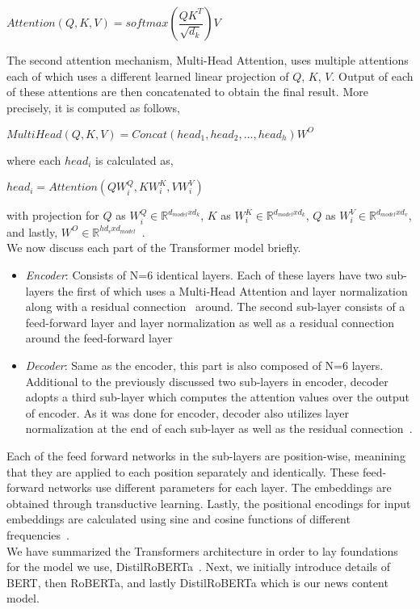 \begin{center}
    $Attention(Q, K, V) = softmax(\dfrac{QK^T}{\sqrt{d_k}})V$
\end{center}
The second attention mechanism, Multi-Head Attention, uses multiple attentions each of which uses a different learned linear projection of $Q$, $K$, $V$. Output of each of these attentions are then concatenated to obtain the final result. More precisely, it is computed as follows,
\begin{center}
    $MultiHead(Q, K, V) = Concat(head_1, head_2, \dots, head_h)W^{O}$
\end{center}
where each $head_i$ is calculated as,
\begin{center}
    $head_i = Attention(QW_i^Q, KW_i^K, VW_i^V)$
\end{center}
with projection for $Q$ as $W_i^Q \in \mathbb{R}^{d_{model}xd_k}$, $K$ as $W_i^K \in \mathbb{R}^{d_{model}xd_k}$, $Q$
as $W_i^V \in \mathbb{R}^{d_{model}xd_v}$, and lastly, $W^{O} \in \mathbb{R}^{hd_vxd_{model}}$~\parencite{AttentionIsAllYouNeed_Vaswani}.\\
We now discuss each part of the Transformer model briefly.\\
\begin{itemize}
    \item \emph{Encoder}: Consists of N=6 identical layers. Each of these layers have two sub-layers the first of which uses a Multi-Head Attention and layer normalization~\parencite{LayerNorm_Ba} along with a residual connection~\parencite{ResidualConnection_He} around. The second sub-layer consists of a feed-forward layer and layer normalization as well as a residual connection around the feed-forward layer~\parencite{AttentionIsAllYouNeed_Vaswani}
    \item \emph{Decoder}: Same as the encoder, this part is also composed of N=6 layers. Additional to the previously discussed two sub-layers in encoder, decoder adopts a third sub-layer which computes the attention values over the output of encoder. As it was done for encoder, decoder also utilizes layer normalization at the end of each sub-layer as well as the residual connection~\parencite{AttentionIsAllYouNeed_Vaswani}.
\end{itemize}
Each of the feed forward networks in the sub-layers are position-wise, meanining that they are applied to each position separately and identically. These feed-forward networks use different parameters for each layer. The embeddings are obtained through transductive learning. Lastly, the positional encodings for input embeddings are calculated using sine and cosine functions of different frequencies~\parencite{AttentionIsAllYouNeed_Vaswani}.\\
We have summarized the Transformers architecture in order to lay foundations for the model we use, DistilRoBERTa~\parencite{DistilBERT_Sanh, RoBERTa_Liu}. Next, we initially introduce details of BERT, then RoBERTa, and lastly DistilRoBERTa which is our news content model.


